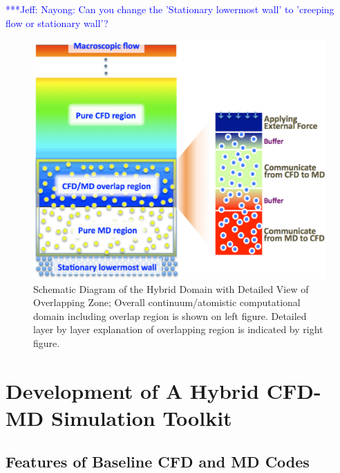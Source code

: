 \documentclass[conference,final]{IEEEtran}
\newcommand{\skonote}[1]{ {\textcolor{blue} { ***Jeff: #1 }}}
\newcommand{\skonote}[1]{}
\begin{document}
\skonote{Nayong: Can you change the 'Stationary lowermost wall' to 'creeping flow or stationary wall'?}


\begin{figure}
\centering
\includegraphics[width=1.0\linewidth]{Couette7.pdf}
\vskip-0.2cm
\caption{\small Schematic Diagram of the Hybrid Domain with Detailed View of Overlapping Zone; Overall continuum/atomistic computational domain including overlap region is shown on left figure. Detailed layer by layer explanation of overlapping region is indicated by right figure.}
\label{Fig:Couette}
\end{figure}



\section{Development of A Hybrid CFD-MD Simulation Toolkit}

\subsection{Features of Baseline CFD and MD Codes}

\end{document}
